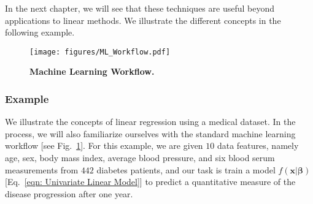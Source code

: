 In the next chapter, we will see that these techniques are useful beyond applications to linear methods. We illustrate the different concepts in the following example.

\begin{figure}[t]
\centering
    \texttt{[image: figures/ML\_Workflow.pdf]}
    \caption{\textbf{Machine Learning Workflow.}}
\label{fig: ML Workflow}
\end{figure}
\subsubsection{Example}
We illustrate the concepts of linear regression using a medical dataset. In the process, we will also familiarize ourselves with the standard machine learning workflow [see Fig.~\ref{fig: ML Workflow}]. For this example, we are given $10$ data features, namely age, sex, body mass index, average blood pressure, and six blood serum measurements from $442$ diabetes patients, and our task is train a model $f(\bm{x}|\bm{\beta})$ [Eq.~\eqref{eqn: Univariate Linear Model}] to predict a quantitative measure of the disease progression after one year. 


